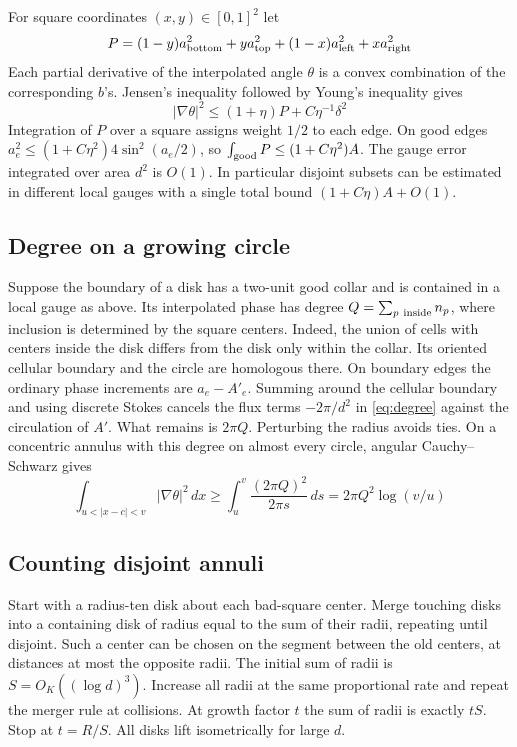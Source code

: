 \documentclass[11pt,reqno]{amsart}
\begin{document}
For square coordinates $(x,y)\in[0,1]^2$ let
\[
 P=(1-y)a_{\rm bottom}^2+ya_{\rm top}^2+
 (1-x)a_{\rm left}^2+xa_{\rm right}^2
\]
Each partial derivative of the interpolated angle $\theta$ is a convex combination of the corresponding $b$'s. Jensen's inequality followed by Young's inequality gives
\[
 |\nabla\theta|^2\le (1+\eta)P+C\eta^{-1}\delta^2
\]
Integration of $P$ over a square assigns weight $1/2$ to each edge. On good edges $a_e^2\le(1+C\eta^2)4\sin^2(a_e/2)$, so $\int_{\rm good}P\le(1+C\eta^2)A$. The gauge error integrated over area $d^2$ is $O(1)$. In particular disjoint subsets can be estimated in different local gauges with a single total bound $(1+C\eta)A+O(1)$.

\subsection{Degree on a growing circle}
Suppose the boundary of a disk has a two-unit good collar and is contained in a local gauge as above. Its interpolated phase has degree $Q=\sum_{p\ {\rm inside}} n_p$, where inclusion is determined by the square centers. Indeed, the union of cells with centers inside the disk differs from the disk only within the collar. Its oriented cellular boundary and the circle are homologous there. On boundary edges the ordinary phase increments are $a_e-A'_e$. Summing around the cellular boundary and using discrete Stokes cancels the flux terms $-2\pi/d^2$ in \eqref{eq:degree} against the circulation of $A'$. What remains is $2\pi Q$. Perturbing the radius avoids ties. On a concentric annulus with this degree on almost every circle, angular Cauchy--Schwarz gives
\begin{equation}\label{eq:ann}
 \int_{u<|x-c|<v}|\nabla\theta|^2\,dx
 \ge \int_u^v\frac{(2\pi Q)^2}{2\pi s}\,ds
 =2\pi Q^2\log(v/u)
\end{equation}

\subsection{Counting disjoint annuli}
Start with a radius-ten disk about each bad-square center. Merge touching disks into a containing disk of radius equal to the sum of their radii, repeating until disjoint. Such a center can be chosen on the segment between the old centers, at distances at most the opposite radii. The initial sum of radii is $S=O_K((\log d)^3)$. Increase all radii at the same proportional rate and repeat the merger rule at collisions. At growth factor $t$ the sum of radii is exactly $tS$. Stop at $t=R/S$. All disks lift isometrically for large $d$.
\end{document}

